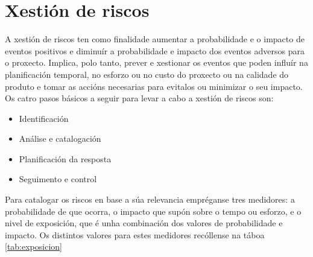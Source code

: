 \section{Xestión de riscos}
A xestión de riscos ten como finalidade aumentar a probabilidade e o impacto de eventos positivos e diminuír a probabilidade e impacto dos eventos adversos para o proxecto. Implica, polo tanto, prever e xestionar os eventos que poden influír na planificación temporal, no esforzo ou no custo do proxecto ou na calidade do produto e tomar as accións necesarias para evitalos ou minimizar o seu impacto. Os catro pasos básicos a seguir para levar a cabo a xestión de riscos son:
\begin{itemize}
\item Identificación
\item Análise e catalogación
\item Planificación da resposta
\item Seguimento e control
\end{itemize}

Para catalogar os riscos en base a súa relevancia empréganse tres medidores: a probabilidade de que ocorra, o impacto que supón sobre o tempo ou esforzo, e o nivel de exposición, que é unha combinación dos valores de probabilidade e impacto. Os distintos valores para estes medidores recóllense na táboa \ref{tab:exposicion}

